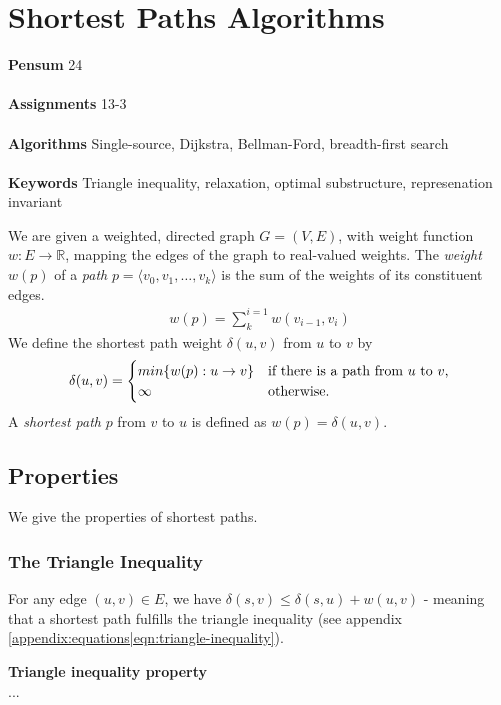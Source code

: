 
\chapter{Shortest Paths Algorithms}
\label{ch:shortestpathsalgorithms}

\textbf{Pensum} 24 \cite{clrs} \\\\
\textbf{Assignments} 13-3 \\\\
\textbf{Algorithms} Single-source, Dijkstra, Bellman-Ford, breadth-first
search \\\\
\textbf{Keywords} Triangle inequality, relaxation, optimal substructure,
represenation invariant
\vspace{1in}

\noindent We are given a weighted, directed graph $G = (V, E)$, with weight
function $w : E \rightarrow \mathbb{R}$, mapping the edges of the graph to
real-valued weights. The \textit{weight} $w(p)$ of a \textit{path} $p =
\langle v_0, v_1, \dots, v_k \rangle$ is the sum of the weights of its
constituent edges.
\begin{align}
	w(p) = \sum_{k}^{i=1} w(v_{i-1}, v_i)
\end{align}
We define the shortest path weight $\delta(u, v)$ from $u$ to $v$ by
\begin{align}
	\delta(u, v) =
	\begin{cases}
		min\{w(p): u \rightarrow v\}
		& \textnormal{if there is a path from $u$ to $v$,} \\
		\infty & \textnormal{otherwise.}
	\end{cases}
\end{align}
A \textit{shortest path} $p$ from $v$ to $u$ is defined as $w(p) =
\delta(u, v)$.

\section{Properties}
We give the properties of shortest paths.

\subsection{The Triangle Inequality}
For any edge $(u, v) \in E$, we have $\delta(s, v) \leq \delta(s, u) +
w(u, v)$ - meaning that a shortest path fulfills the triangle inequality (see
appendix \ref{appendix:equations|eqn:triangle-inequality}).
\begin{lemma}
	\textbf{Triangle inequality property} \\
	...
\end{lemma}

